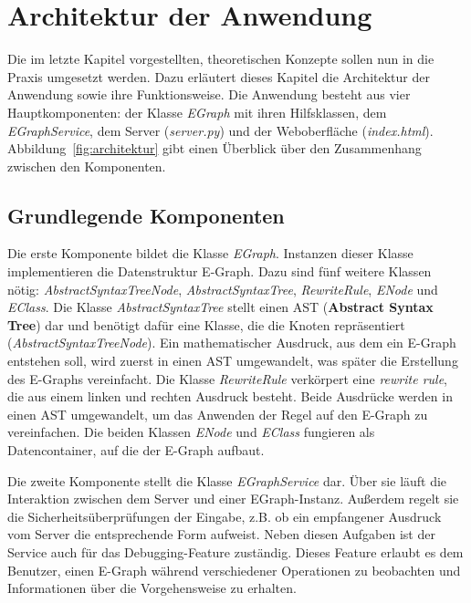 \section{Architektur der Anwendung}\label{sec:architektur}

Die im letzte Kapitel vorgestellten, theoretischen Konzepte sollen nun in die Praxis umgesetzt werden.
Dazu erläutert dieses Kapitel die Architektur der Anwendung sowie ihre Funktionsweise.
Die Anwendung besteht aus vier Hauptkomponenten: der Klasse \textit{EGraph} mit ihren Hilfsklassen, dem \textit{EGraphService}, dem Server (\textit{server.py}) und der
Weboberfläche (\textit{index.html}). Abbildung~\ref{fig:architektur} gibt einen Überblick über den Zusammenhang zwischen den Komponenten. 

\subsection{Grundlegende Komponenten}

Die erste Komponente bildet die Klasse \textit{EGraph}. Instanzen dieser Klasse implementieren die Datenstruktur E-Graph. Dazu sind fünf weitere Klassen nötig: 
\textit{AbstractSyntaxTreeNode}, \textit{AbstractSyntaxTree}, \textit{RewriteRule}, \textit{ENode} und \textit{EClass}.
Die Klasse \textit{AbstractSyntaxTree} stellt einen AST (\textbf{Abstract Syntax Tree}) dar und benötigt dafür eine Klasse, die die Knoten repräsentiert (\textit{AbstractSyntaxTreeNode}).
Ein mathematischer Ausdruck, aus dem ein E-Graph entstehen soll, wird zuerst in einen AST umgewandelt, was später die Erstellung des E-Graphs vereinfacht.
Die Klasse \textit{RewriteRule} verkörpert eine \textit{rewrite rule}, die aus einem linken und rechten Ausdruck besteht. Beide Ausdrücke werden in einen AST umgewandelt, um das
Anwenden der Regel auf den E-Graph zu vereinfachen.
Die beiden Klassen \textit{ENode} und \textit{EClass} fungieren als Datencontainer, auf die der E-Graph aufbaut.

Die zweite Komponente stellt die Klasse \textit{EGraphService} dar. Über sie läuft die Interaktion zwischen dem Server und einer EGraph-Instanz.
Außerdem regelt sie die Sicherheitsüberprüfungen der Eingabe, z.B. ob ein empfangener Ausdruck vom Server die entsprechende Form aufweist.
Neben diesen Aufgaben ist der Service auch für das Debugging-Feature zuständig. Dieses Feature erlaubt es dem Benutzer, einen E-Graph während verschiedener Operationen
zu beobachten und Informationen über die Vorgehensweise zu erhalten. 

